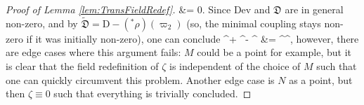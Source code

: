\begin{proof}[Proof of Lemma \ref{lem:TransFieldRedef}]
&=
0.
\eas
Since $\mathrm{Dev}$ and $\mathfrak{D}$ are in general non-zero, and by $\widetilde{\mathfrak{D}} = \mathrm{D} - ({}^*\rho)(\varpi_2)$ (so, the minimal coupling stays non-zero if it was initially non-zero), one can conclude
\bas
\widetilde{\zeta}^{\lambda + \lambda^\prime - \lambda^\prime \circ \rho \circ \lambda} 
&=
\widetilde{\widetilde{\zeta}^\lambda}^{\lambda^\prime},
\eas
however, there are edge cases where this argument fails: $M$ could be a point for example, but it is clear that the field redefinition of $\zeta$ is independent of the choice of $M$ such that one can quickly circumvent this problem. Another edge case is $N$ as a point, but then $\zeta \equiv 0$ such that everything is trivially concluded.

\end{proof}
